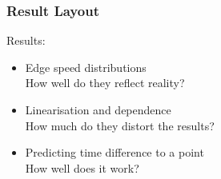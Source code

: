 \documentclass{beamer}
\begin{document}
	\begin{frame}
		\frametitle{Result Layout}
		{ Results:}
		\begin{itemize}
			\item Edge speed distributions\\\hspace{0.3cm}How well do they reflect reality?
			\item Linearisation and dependence\\\hspace{0.3cm}How much do they distort the results?
			\item Predicting time difference to a point\\\hspace{0.3cm}How well does it work?
		\end{itemize}
	\end{frame}
\end{document}
